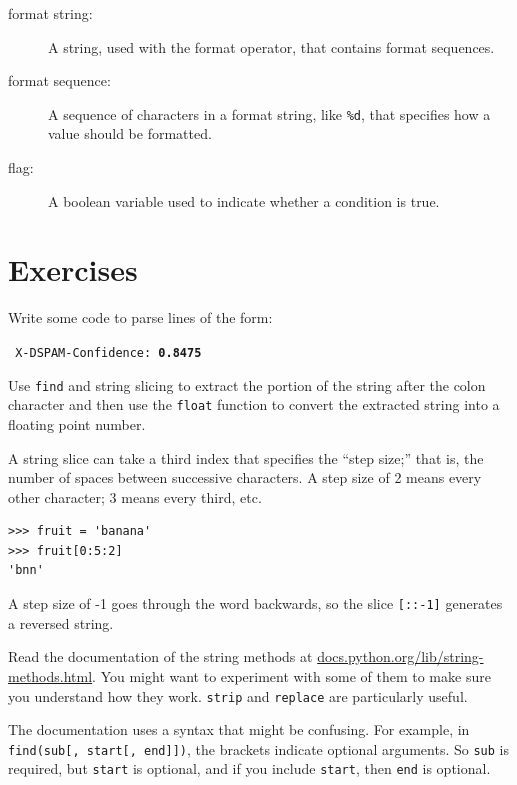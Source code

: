 \documentclass[10pt]{book}
\begin{document}
\begin{description}
\item[format string:] A string, used with the format operator, that
contains format sequences.

\item[format sequence:] A sequence of characters in a format string,
like {\tt \%d}, that specifies how a value should be formatted.

\item[flag:] A boolean variable used to indicate whether a condition
is true.


\end{description}


\section{Exercises}

\begin{ex}
Write some code to parse lines of the form:

{\tt
X-DSPAM-Confidence: {\bf 0.8475}
}

Use {\tt find} and string slicing to extract the portion
of the string after the colon character and then use the 
{\tt float} function to convert the extracted string 
into a floating point number.

\end{ex}

\begin{ex}


A string slice can take a third index that specifies the ``step
size;'' that is, the number of spaces between successive characters.
A step size of 2 means every other character; 3 means every third,
etc.

\beforeverb
\begin{verbatim}
>>> fruit = 'banana'
>>> fruit[0:5:2]
'bnn'
\end{verbatim}
\afterverb

A step size of -1 goes through the word backwards, so
the slice \verb"[::-1]" generates a reversed string.

\end{ex}


\begin{ex}

Read the documentation of the string methods at
\url{docs.python.org/lib/string-methods.html}.  You
might want to experiment with some of them to make sure
you understand how they work.  {\tt strip} and
{\tt replace} are particularly useful.

The documentation uses a syntax that might be confusing.
For example, in \verb"find(sub[, start[, end]])", the brackets
indicate optional arguments.  So {\tt sub} is required, but
{\tt start} is optional, and if you include {\tt start},
then {\tt end} is optional.
\end{ex}
\end{document}
